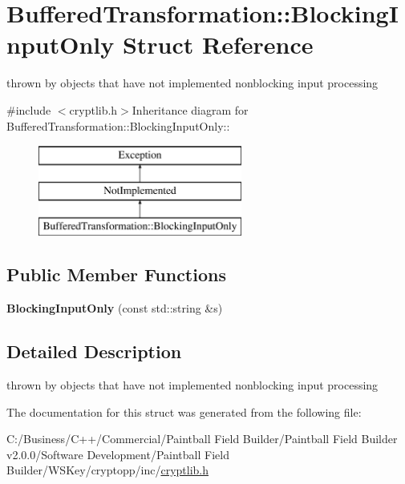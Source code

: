 \hypertarget{struct_buffered_transformation_1_1_blocking_input_only}{
\section{BufferedTransformation::BlockingInputOnly Struct Reference}
\label{struct_buffered_transformation_1_1_blocking_input_only}
}


thrown by objects that have not implemented nonblocking input processing  


{\ttfamily \#include $<$cryptlib.h$>$}Inheritance diagram for BufferedTransformation::BlockingInputOnly::\begin{figure}[H]
\begin{center}
\leavevmode
\includegraphics[height=3cm]{struct_buffered_transformation_1_1_blocking_input_only}
\end{center}
\end{figure}
\subsection*{Public Member Functions}
\begin{DoxyCompactItemize}
\item 
\hypertarget{struct_buffered_transformation_1_1_blocking_input_only_a55cb3a986ad96a59f566d8b2ae65c561}{
{\bfseries BlockingInputOnly} (const std::string \&s)}
\label{struct_buffered_transformation_1_1_blocking_input_only_a55cb3a986ad96a59f566d8b2ae65c561}

\end{DoxyCompactItemize}


\subsection{Detailed Description}
thrown by objects that have not implemented nonblocking input processing 

The documentation for this struct was generated from the following file:\begin{DoxyCompactItemize}
\item 
C:/Business/C++/Commercial/Paintball Field Builder/Paintball Field Builder v2.0.0/Software Development/Paintball Field Builder/WSKey/cryptopp/inc/\hyperlink{cryptlib_8h}{cryptlib.h}\end{DoxyCompactItemize}
